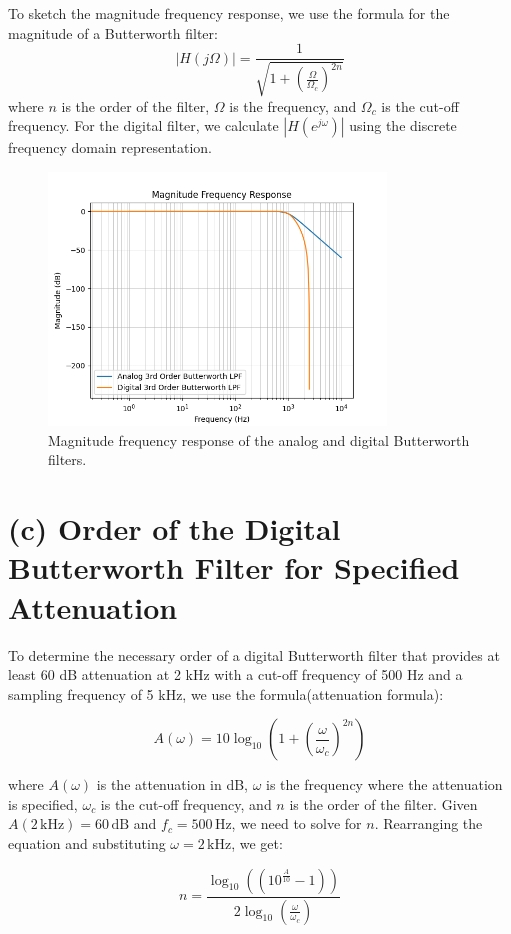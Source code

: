 \documentclass{article}
\begin{document}
To sketch the magnitude frequency response, we use the formula for the magnitude of a Butterworth filter:
\[
|H(j\Omega)| = \frac{1}{\sqrt{1 + \left(\frac{\Omega}{\Omega_c}\right)^{2n}}}
\]
where $n$ is the order of the filter, $\Omega$ is the frequency, and $\Omega_c$ is the cut-off frequency. For the digital filter, we calculate $|H(e^{j\omega})|$ using the discrete frequency domain representation.
\begin{figure}[H]
    \centering
    \includegraphics[width=0.8\textwidth]{Figure_1.png}
    \caption{Magnitude frequency response of the analog and digital Butterworth filters.}
\end{figure}

\section*{(c) Order of the Digital Butterworth Filter for Specified Attenuation}

To determine the necessary order of a digital Butterworth filter that provides at least 60 dB attenuation at 2 kHz with a cut-off frequency of 500 Hz and a sampling frequency of 5 kHz, we use the formula(attenuation formula):

\[ A(\omega) = 10 \log_{10}\left(1 + \left(\frac{\omega}{\omega_c}\right)^{2n}\right) \]

where $A(\omega)$ is the attenuation in dB, $\omega$ is the frequency where the attenuation is specified, $\omega_c$ is the cut-off frequency, and $n$ is the order of the filter. Given $A(2 \, \text{kHz}) = 60 \, \text{dB}$ and $f_c = 500 \, \text{Hz}$, we need to solve for $n$. Rearranging the equation and substituting $\omega = 2 \, \text{kHz}$, we get:

\[ n = \frac{\log_{10}\left(\left(10^{\frac{A}{10}} - 1\right)\right)}{2 \log_{10}\left(\frac{\omega}{\omega_c}\right)} \]
\end{document}
